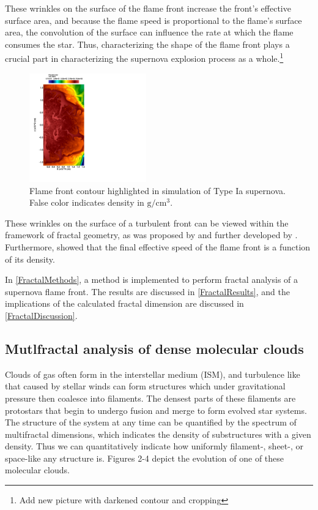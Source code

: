 \documentclass[iop]{emulateapj}
\begin{document}
These wrinkles on the surface of the flame front increase the front's effective surface area, and because the flame speed is proportional to the flame's surface area, the convolution of the surface can influence the rate at which the flame consumes the star. Thus, characterizing the shape of the flame front plays a crucial part in characterizing the supernova explosion process as a whole.\footnote{Add new picture with darkened contour and cropping}

\begin{figure}[t]
\begin{center}
\includegraphics[width=0.45\textwidth,clip=true]{Graphics/n7d1r10t15b0002.png}
\caption{Flame front contour highlighted in simulation of Type Ia supernova. False color indicates density in $\mathrm{g/cm^3}$.
\label{f:flamefrontwithcontour}}
\end{center}
\end{figure} 

These wrinkles on the surface of a turbulent front can be viewed within the framework of fractal geometry, as was proposed by \cite{Mandelbrot1975} and further developed by \cite{Timmes1994}. Furthermore, \cite{Timmes1994} showed that the final effective speed of the flame front is a function of its density.

In \textsection \ref{FractalMethods}, a method is implemented to perform fractal analysis of a supernova flame front. The results are discussed in \textsection \ref{FractalResults}, and the implications of the calculated fractal dimension are discussed in \textsection \ref{FractalDiscussion}.


\subsection{Mutlfractal analysis of dense molecular clouds}
Clouds of gas often form in the interstellar medium (ISM), and turbulence like that caused by stellar winds can form structures which under gravitational pressure then coalesce into filaments. The densest parts of these filaments are protostars that begin to undergo fusion and merge to form evolved star systems. The structure of the system at any time can be quantified by the spectrum of multifractal dimensions, which indicates the density of substructures with a given density. Thus we can quantitatively indicate how uniformly filament-, sheet-, or space-like any structure is. Figures 2-4 depict the evolution of one of these molecular clouds.
\end{document}
